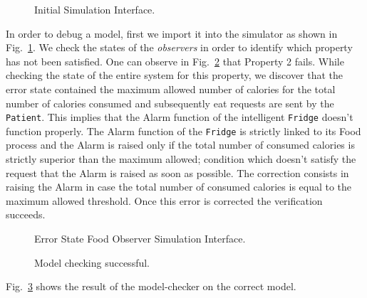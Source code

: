 \documentclass[a4paper,twoside]{article}
\begin{document}
\begin{figure}[!h]
  \centering
  {}
  \caption{Initial Simulation Interface.}
  \label{fig:initialsimulationinterface}
 \end{figure}

In order to  debug  a model, first we import it into the simulator as shown in Fig.~\ref{fig:initialsimulationinterface}. We check the states of the \textit{observers} in order to identify which property has not been satisfied. One can observe in Fig.~\ref{fig:errorstatefoodobserver} that Property 2 fails. While checking the state of the entire system for this property, we discover that the error state contained the maximum allowed number of calories for the total number of calories consumed and subsequently eat requests are sent by the \texttt{Patient}. This implies that the Alarm function of the intelligent \texttt{Fridge} doesn't function properly. The Alarm function of the \texttt{Fridge} is strictly linked to its Food process and the Alarm is raised only if the total number of consumed calories is strictly superior than the maximum allowed; condition which doesn't satisfy the request that the Alarm is raised as soon as possible. The correction consists in raising the Alarm in case the total number of consumed calories is equal to the maximum allowed threshold. Once this error is corrected the verification succeeds.

\begin{figure}[!h]
  \centering
  {}
  \caption{Error State Food Observer Simulation Interface.}
  \label{fig:errorstatefoodobserver}
 \end{figure}

\begin{figure}[!h]
  \centering
  {}
  \caption{Model checking successful.}
  \label{fig:verificationok}
 \end{figure} 

Fig.~\ref{fig:verificationok} shows the result of the model-checker on the correct model.
\end{document}
